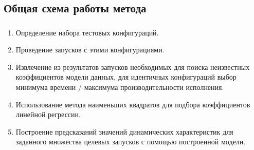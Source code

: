\documentclass[unicode, t, 11pt]{beamer}%
\begin{document}
		\subsection{Общая схема работы метода}
		\begin{frame}
			\frametitle{\insertsection}
	 		\framesubtitle{\insertsubsection}
	 		\begin{enumerate}[label=\arabic*)]
				\item Определение набора тестовых конфигураций.
				\item Проведение запусков с этими конфигурациями.
				\item Извлечение из результатов запусков необходимых для поиска неизвестных коэффициентов модели данных, для идентичных конфигураций выбор минимума времени / максимума производительности исполнения.
				\item Использование метода наименьших квадратов для подбора коэффициентов линейной регрессии.
				\item Построение предсказаний значений динамических характеристик для заданного множества целевых запусков с помощью построенной модели.
			\end{enumerate}
		\end{frame}
\end{document}
